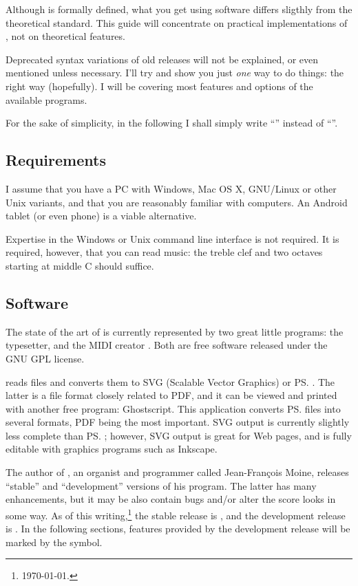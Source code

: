 \documentclass[a4paper,12pt]{book}
\begin{document}
Although \ABCPLUS{} is formally defined, what you get using software
differs sligthly from the theoretical standard. This guide will
concentrate on practical implementations of \ABCPLUS, not on
theoretical features.

Deprecated syntax variations of old \ABC{} releases will not be
explained, or even mentioned unless necessary. I'll try and show you
just \emph{one} way to do things: the right way (hopefully). I will be
covering most features and options of the available programs.

For the sake of simplicity, in the following I shall simply write
``\ABC{}'' instead of ``\ABCPLUS{}''. 



\subsection{Requirements}

I assume that you have a PC with Windows, Mac OS X, GNU/Linux or other
Unix variants, and that you are reasonably familiar with computers. An
Android tablet (or even phone) is a viable alternative.

Expertise in the Windows or Unix command line interface is not
required. It is required, however, that you can read music: the treble
clef and two octaves starting at middle C should suffice.


\subsection{Software}

The state of the art of \ABC{} is currently represented by two great
little programs: the \abcm{} typesetter, and the MIDI creator \abcmid.
Both are free software released under the GNU GPL license.

\abcm{} reads \ABC{} files and converts them to SVG (Scalable Vector
Graphics) or \ps. The latter is a file format closely related to PDF,
and it can be viewed and printed with another free program:
Ghostscript. This application converts \ps{} files into several
formats, PDF being the most important. SVG output is currently
slightly less complete than \ps; however, SVG output is great for Web
pages, and is fully editable with graphics programs such as Inkscape.

The author of \abcm, an organist and programmer called Jean-Fran\c
cois Moine, releases ``stable'' and ``development'' versions of his
program. The latter has many enhancements, but it may be also contain
bugs and/or alter the score looks in some way. As of this
writing,\footnote{\today.} the stable release is \abcmstable, and the
development release is \abcmdev. In the following sections, features
provided by the development release will be marked by the \devel{}
symbol.
\end{document}
